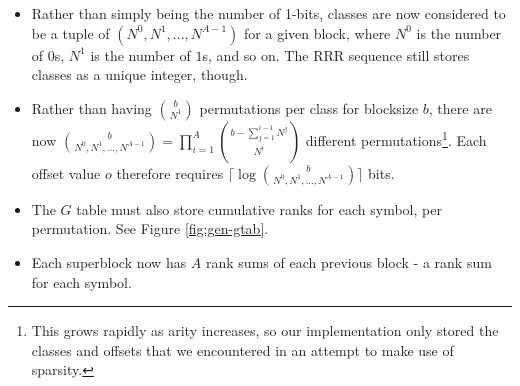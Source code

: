 \begin{itemize}
	\item
		Rather than simply being the number of 1-bits, classes are now 
		considered to be a tuple of $(N^0, N^1, ..., N^{A-1})$ for a given 
		block, where $N^0$ is the number of $0$s, $N^1$ is the number of $1$s, 
		and so on. The RRR sequence still stores classes as a unique integer, 
		though.

	\item
		Rather than having $b \choose N^1$ permutations per class for blocksize 
		$b$, there are now ${b \choose N^0, N^1,...,N^{A-1}} = 
		\prod_{i = 1}^{A} {{b - \sum_{j = 1}^{i - 1} N^j} \choose N^i}
		$ different permutations\footnote{This grows rapidly as arity increases, 
		so our implementation only stored the classes and offsets that we 
		encountered in an attempt to make use of sparsity.}.
		Each offset value $o$ therefore requires $\lceil\log {b \choose N^0, 
		N^1,...,N^{A-1}}\rceil$ bits.

	\item
		The $G$ table must also store cumulative ranks for each symbol, per 
		permutation. See Figure \ref{fig:gen-gtab}.

	\item
		Each superblock now has $A$ rank sums of each previous block - a rank 
		sum for each symbol.
\end{itemize}
